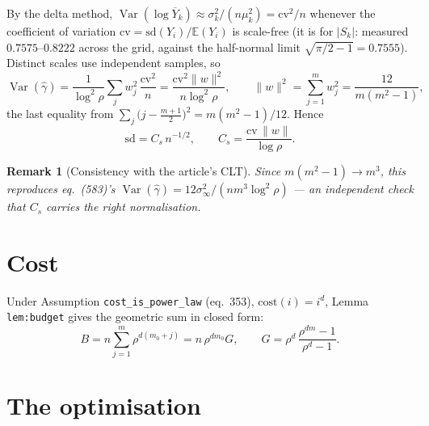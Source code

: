 \documentclass[11pt]{article}
\newtheorem{remark}{Remark}
\newcommand{\E}{\mathbb{E}}
\newcommand{\Var}{\operatorname{Var}}
\newcommand{\cv}{\mathrm{cv}}
\newcommand{\sd}{\mathrm{sd}}
\begin{document}
By the delta method, $\Var(\log\overline Y_k)\approx
\sigma_k^2/(n\mu_k^2)=\cv^2/n$ whenever the coefficient of variation
$\cv=\sd(Y_i)/\E(Y_i)$ is scale-free (it is for $\lvert S_k\rvert$: measured
$0.7575$--$0.8222$ across the grid, against the half-normal limit
$\sqrt{\pi/2-1}=0.7555$). Distinct scales use independent samples, so
\begin{equation}
  \Var(\hat\gamma)=\frac{1}{\log^2\rho}\sum_j w_j^2\,\frac{\cv^2}{n}
  =\frac{\cv^2\lVert w\rVert^2}{n\log^2\rho},
  \qquad
  \lVert w\rVert^2=\sum_{j=1}^m w_j^2=\frac{12}{m(m^2-1)},
\end{equation}
the last equality from $\sum_j\bigl(j-\tfrac{m+1}{2}\bigr)^2=m(m^2-1)/12$.
Hence
\begin{equation}
  \boxed{\;
  \sd=C_s\,n^{-1/2},
  \qquad
  C_s=\frac{\cv\,\lVert w\rVert}{\log\rho}.
  \;}
  \label{eq:Cs}
\end{equation}

\begin{remark}[Consistency with the article's CLT]
Since $m(m^2-1)\to m^3$, this reproduces eq.~(583)'s
$\Var(\hat\gamma)=12\sigma_\infty^2/(nm^3\log^2\rho)$ --- an independent check
that $C_s$ carries the right normalisation.
\end{remark}

\section{Cost}

Under Assumption \texttt{cost\_is\_power\_law} (eq.~353), $\mathrm{cost}(i)=i^d$,
Lemma \texttt{lem:budget} gives the geometric sum in closed form:
\begin{equation}
  B=n\sum_{j=1}^{m}\rho^{d(m_0+j)}=n\,\rho^{dm_0}G,
  \qquad
  G=\rho^{d}\,\frac{\rho^{dm}-1}{\rho^{d}-1}.
  \label{eq:budget}
\end{equation}

\section{The optimisation}
\end{document}
